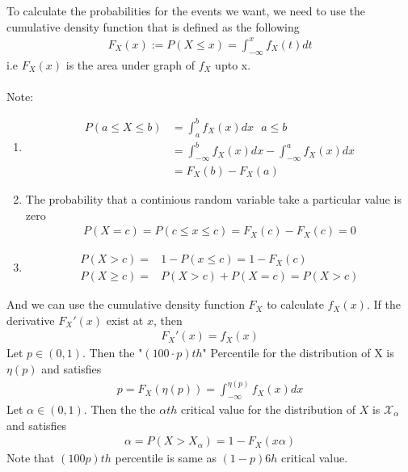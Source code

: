 \documentclass[11pt,oneside]{book}
\theoremstyle{newStyle}
\newcommand{\X}{\mathcal{X}}
\newcommand{\note}{\color{red}Note: \color{black}}
\begin{document}
To calculate the probabilities for the events we want, we need to use the cumulative density function that is defined as the following \begin{align*}
F_X(x):=P(X\leq x)=\int_{-\infty}^{x}f_X(t)dt
\end{align*}
i.e $F_X(x)$ is the area under graph of $f_X$ upto x. \\
\hfill\\
\note \begin{enumerate}
\item \begin{align*}
P(a\leq X\leq b)&=\int_{a}^{b}f_X(x)dx \text{ }a\leq b\\
&=\int_{-\infty}^{b}f_X(x)dx-\int_{-\infty}^{a}f_X(x)dx\\
&=F_X(b)-F_X(a)
\end{align*}
\item The probability that a continious random variable take a particular value is zero\begin{align*}
P(X=c)=P(c\leq x \leq c)=F_X(c)-F_X(c)=0
\end{align*}
\item \begin{align*}
P(X>c)=&1-P(x\leq c)=1-F_X(c)\\
P(X\geq c)=&P(X>c)+P(X=c)=P(X>c)
\end{align*}
\end{enumerate}
And we can use the cumulative density function $F_X$ to calculate $f_X(x).$ If the derivative $F_X'(x)$ exist at $x$, then \begin{align*}
F_X'(x)=f_X(x)
\end{align*}
Let $p\in (0,1).$ Then the "$(100\cdot p)th$" Percentile for the distribution of X is $\eta(p)$ and satisfies \begin{align*}
p=F_X(\eta (p))=\int_{-\infty}^{\eta (p)}f_X(x)dx
\end{align*}
Let $\alpha\in (0,1)$. Then the the $\alpha th$ critical value for the distribution of $X$ is $\X_{\alpha}$ and satisfies\begin{align*}
\alpha = P(X>X_{\alpha})=1-F_X(x\alpha)
\end{align*}
Note that $(100p)th$ percentile is same as $(1-p)6h$ critical value.
\end{document}
